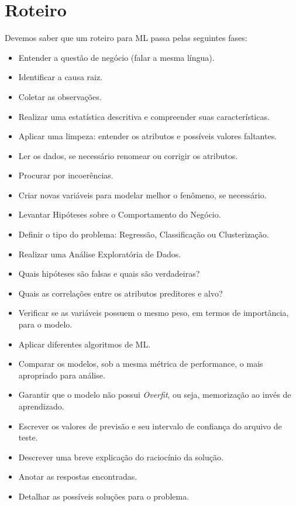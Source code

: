 \section{Roteiro}
Devemos saber que um roteiro para ML passa pelas seguintes fases: \vspace{-1em}
\begin{itemize}[noitemsep]
	\item Entender a questão de negócio (falar a mesma língua).
	\item Identificar a causa raiz.
	\item Coletar as observações.
	\item Realizar uma estatística descritiva e compreender suas características.
	\item Aplicar uma limpeza: entender os atributos e possíveis valores faltantes.
	\item Ler os dados, se necessário renomear ou corrigir os atributos.
	\item Procurar por incoerências.
	\item Criar novas variáveis para modelar melhor o fenômeno, se necessário.
	\item Levantar Hipóteses sobre o Comportamento do Negócio.
	\item Definir o tipo do problema: Regressão, Classificação ou Clusterização.
	\item Realizar uma Análise Exploratória de Dados.
	\item Quais hipóteses são falsas e quais são verdadeiras?
	\item Quais as correlações entre os atributos preditores e alvo?
	\item Verificar se as variáveis possuem o mesmo peso, em termos de importância, para o modelo.
	\item Aplicar diferentes algoritmos de ML.
	\item Comparar os modelos, sob a mesma métrica de performance, o mais apropriado para análise.
	\item Garantir que o modelo não possui \textit{Overfit}, ou seja, memorização ao invés de aprendizado.
	\item Escrever os valores de previsão e seu intervalo de confiança do arquivo de teste.
	\item Descrever uma breve explicação do raciocínio da solução.
	\item Anotar as respostas encontradas.
	\item Detalhar as possíveis soluções para o problema.
\end{itemize}

